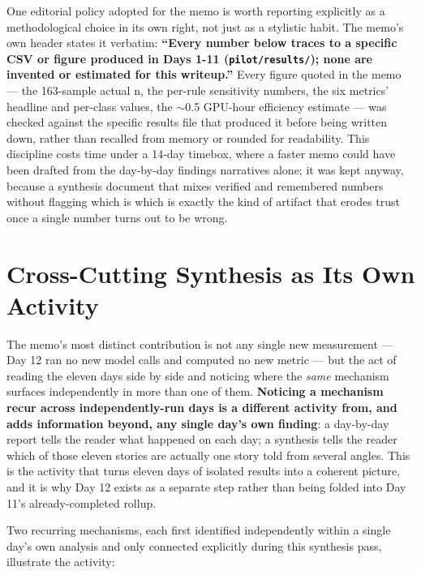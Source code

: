 One editorial policy adopted for the memo is worth reporting explicitly as a methodological
choice in its own right, not just as a stylistic habit. The memo's own header states it
verbatim: \textbf{``Every number below traces to a specific CSV or figure produced in Days 1-11
(\texttt{pilot/results/}); none are invented or estimated for this writeup.''} Every figure
quoted in the memo --- the 163-sample actual n, the per-rule sensitivity numbers, the six
metrics' headline and per-class values, the $\sim$0.5 GPU-hour efficiency estimate --- was
checked against the specific results file that produced it before being written down, rather
than recalled from memory or rounded for readability. This discipline costs time under a
14-day timebox, where a faster memo could have been drafted from the day-by-day findings
narratives alone; it was kept anyway, because a synthesis document that mixes verified and
remembered numbers without flagging which is which is exactly the kind of artifact that erodes
trust once a single number turns out to be wrong.

\section{Cross-Cutting Synthesis as Its Own Activity}

The memo's most distinct contribution is not any single new measurement --- Day 12 ran no new
model calls and computed no new metric --- but the act of reading the eleven days side by side
and noticing where the \emph{same} mechanism surfaces independently in more than one of them.
\textbf{Noticing a mechanism recur across independently-run days is a different activity from,
and adds information beyond, any single day's own finding}: a day-by-day report tells the reader
what happened on each day; a synthesis tells the reader which of those eleven stories are
actually one story told from several angles. This is the activity that turns eleven days of
isolated results into a coherent picture, and it is why Day 12 exists as a separate step rather
than being folded into Day 11's already-completed rollup.

Two recurring mechanisms, each first identified independently within a single day's own
analysis and only connected explicitly during this synthesis pass, illustrate the activity:

